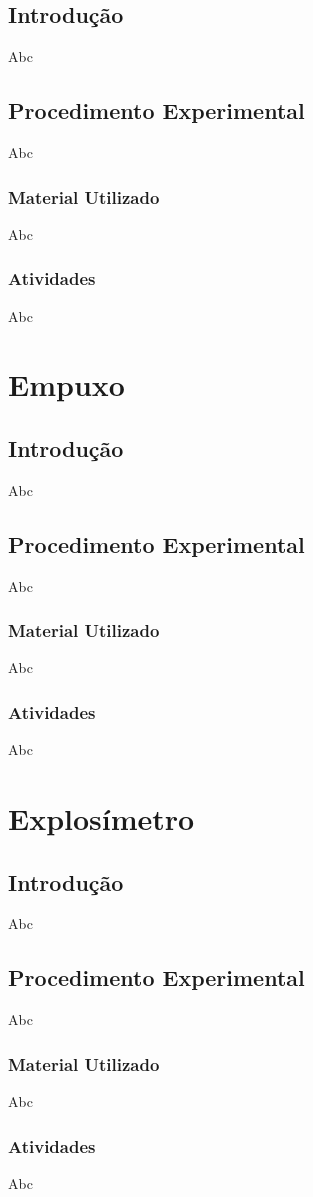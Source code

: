 \documentclass[12pt,a4paper]{article}
\begin{document}
		\subsection{Introdução}
		Abc
		\subsection{Procedimento Experimental}
		Abc
		\subsubsection{Material Utilizado}
		Abc
		\subsubsection{Atividades}
		Abc
	\section{Empuxo}
		\subsection{Introdução}
		Abc
		\subsection{Procedimento Experimental}
		Abc
		\subsubsection{Material Utilizado}
		Abc
		\subsubsection{Atividades}
		Abc
	\section{Explosímetro}
		\subsection{Introdução}
		Abc
		\subsection{Procedimento Experimental}
		Abc
		\subsubsection{Material Utilizado}
		Abc
		\subsubsection{Atividades}
		Abc
\end{document}
